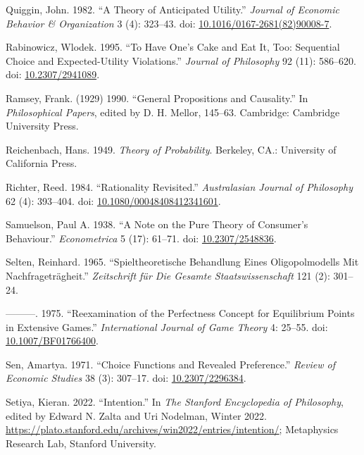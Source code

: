 \documentclass[
  10pt,
  letterpaper,
  DIV=11,
  numbers=noendperiod,
  twoside]{scrartcl}
\newlength{\cslhangindent}
\newenvironment{CSLReferences}[2] %
 {\begin{list}{}{%
  \setlength{\itemindent}{0pt}
  \setlength{\leftmargin}{0pt}
  \setlength{\parsep}{0pt}
  \ifodd #1
   \setlength{\leftmargin}{\cslhangindent}
   \setlength{\itemindent}{-1\cslhangindent}
  \fi
  \setlength{\itemsep}{#2\baselineskip}}}
 {\end{list}}
\begin{document}
\begin{CSLReferences}{1}{0}
Quiggin, John. 1982. {``A Theory of Anticipated Utility.''}
\emph{Journal of Economic Behavior \& Organization} 3 (4): 323--43. doi:
\href{https://doi.org/10.1016/0167-2681(82)90008-7}{10.1016/0167-2681(82)90008-7}.

Rabinowicz, Wlodek. 1995. {``To Have One's Cake and Eat It, Too:
Sequential Choice and Expected-Utility Violations.''} \emph{Journal of
Philosophy} 92 (11): 586--620. doi:
\href{https://doi.org/10.2307/2941089}{10.2307/2941089}.

Ramsey, Frank. (1929) 1990. {``General Propositions and Causality.''} In
\emph{Philosophical Papers}, edited by D. H. Mellor, 145--63. Cambridge:
Cambridge University Press.

Reichenbach, Hans. 1949. \emph{Theory of Probability}. Berkeley, CA.:
University of California Press.

Richter, Reed. 1984. {``Rationality Revisited.''} \emph{Australasian
Journal of Philosophy} 62 (4): 393--404. doi:
\href{https://doi.org/10.1080/00048408412341601}{10.1080/00048408412341601}.

Samuelson, Paul A. 1938. {``A Note on the Pure Theory of Consumer's
Behaviour.''} \emph{Econometrica} 5 (17): 61--71. doi:
\href{https://doi.org/10.2307/2548836}{10.2307/2548836}.

Selten, Reinhard. 1965. {``Spieltheoretische Behandlung Eines
Oligopolmodells Mit Nachfragetr{ä}gheit.''} \emph{Zeitschrift f{ü}r Die
Gesamte Staatswissenschaft} 121 (2): 301--24.

---------. 1975. {``Reexamination of the Perfectness Concept for
Equilibrium Points in Extensive Games.''} \emph{International Journal of
Game Theory} 4: 25--55. doi:
\href{https://doi.org/10.1007/BF01766400}{10.1007/BF01766400}.

Sen, Amartya. 1971. {``Choice Functions and Revealed Preference.''}
\emph{Review of Economic Studies} 38 (3): 307--17. doi:
\href{https://doi.org/10.2307/2296384}{10.2307/2296384}.

Setiya, Kieran. 2022. {``{Intention}.''} In \emph{The {Stanford}
Encyclopedia of Philosophy}, edited by Edward N. Zalta and Uri Nodelman,
{W}inter 2022.
\url{https://plato.stanford.edu/archives/win2022/entries/intention/};
Metaphysics Research Lab, Stanford University.


\end{CSLReferences}
\end{document}
